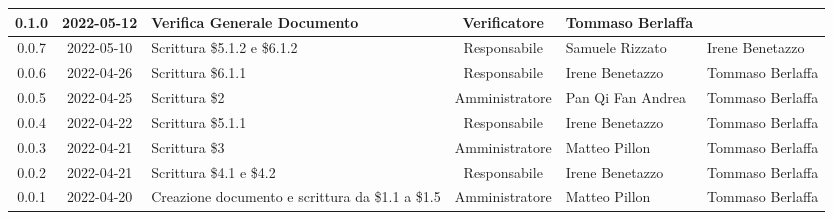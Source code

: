 \begin{center}
\begin{longtable}{ |c|c|p{8em}|c|m{5em}|m{5em}| }
	\hline 
	0.1.0 & 2022-05-12 & Verifica Generale Documento & Verificatore & Tommaso \newline Berlaffa  & \\
    \hline
	0.0.7 & 2022-05-10 & Scrittura \$5.1.2 e \$6.1.2 & Responsabile & Samuele \newline Rizzato & Irene \newline Benetazzo \\
	\hline
	0.0.6 & 2022-04-26 & Scrittura \$6.1.1 & Responsabile & Irene \newline Benetazzo & Tommaso \newline Berlaffa\\
	\hline 
	0.0.5& 2022-04-25 & Scrittura \$2 & Amministratore & Pan Qi Fan \newline Andrea & Tommaso \newline Berlaffa\\
	\hline
	0.0.4 & 2022-04-22 & Scrittura \$5.1.1 & Responsabile & Irene \newline Benetazzo & Tommaso \newline Berlaffa\\
	\hline 
	0.0.3 & 2022-04-21 & Scrittura \$3 & Amministratore & Matteo \newline Pillon & Tommaso \newline Berlaffa\\
	\hline
	0.0.2 & 2022-04-21 & Scrittura \newline \$4.1 e \$4.2 & Responsabile & Irene \newline Benetazzo & Tommaso \newline Berlaffa\\
	\hline
    0.0.1 & 2022-04-20 & Creazione documento e scrittura \newline da \$1.1 a \$1.5 & Amministratore & Matteo \newline Pillon & Tommaso \newline Berlaffa \\ 
	\hline
	\end{longtable}
	\end{center}
	\newpage